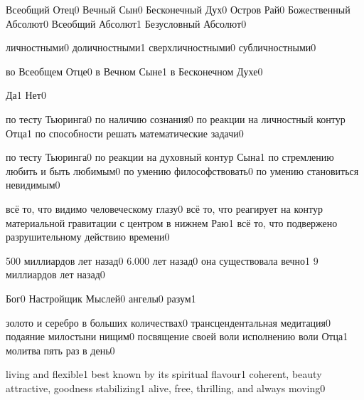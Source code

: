 {Всеобщий Отец}{0}
{Вечный Сын}{0}
{Бесконечный Дух}{0}
{Остров Рай}{0}
{Божественный Абсолют}{0}
{Всеобщий Абсолют}{1}
{Безусловный Абсолют}{0}
\qstop

{личностными}{0}
{доличностными}{1}
{сверхличностными}{0}
{субличностными}{0}
\qstop

{во Всеобщем Отце}{0}
{в Вечном Сыне}{1}
{в Бесконечном Духе}{0}
\qstop

{Да}{1}
{Нет}{0}
\qstop

{по тесту Тьюринга}{0}
{по наличию сознания}{0}
{по реакции на личностный контур Отца}{1}
{по способности решать математические задачи}{0}
\qstop

{по тесту Тьюринга}{0}
{по реакции на духовный контур Сына}{1}
{по стремлению любить и быть любимым}{0}
{по умению философствовать}{0}
{по умению становиться невидимым}{0}
\qstop

{всё то, что видимо человеческому глазу}{0}
{всё то, что реагирует на контур материальной гравитации с центром в нижнем Раю}{1}
{всё то, что подвержено разрушительному действию времени}{0}
\qstop


{500 миллиардов лет назад}{0}
{6.000 лет назад}{0}
{она существовала вечно}{1}
{9 миллиардов лет назад}{0}
\qstop

{Бог}{0}
{Настройщик Мыслей}{0}
{ангелы}{0}
{разум}{1}
\qstop


{золото и серебро в больших количествах}{0}
{трансцендентальная медитация}{0}
{подаяние милостыни нищим}{0}
{посвящение своей воли исполнению воли Отца}{1}
{молитва пять раз в день}{0}
\qstop



{living and flexible}{1}
{best known by its spiritual flavour}{1}
{coherent, beauty attractive, goodness stabilizing}{1}
{alive, free, thrilling, and always moving}{0}
\qstop

